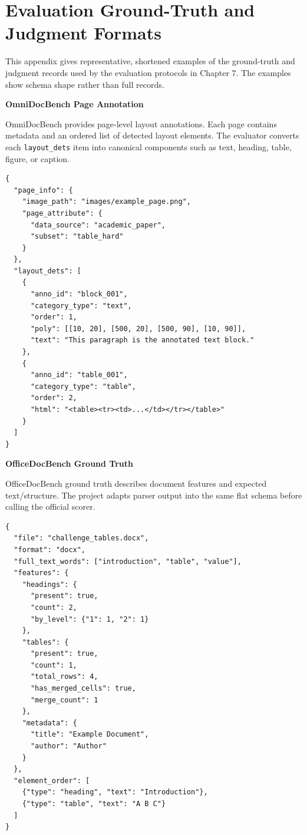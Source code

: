 \chapter{Evaluation Ground-Truth and Judgment Formats}\label{chap:evaluation_gt_formats}


This appendix gives representative, shortened examples of the ground-truth and judgment records used by the evaluation protocols in Chapter 7. The examples show schema shape rather than full records.

\textbf{OmniDocBench Page Annotation}

OmniDocBench provides page-level layout annotations. Each page contains metadata and an ordered list of detected layout elements. The evaluator converts each \texttt{layout\_dets} item into canonical components such as text, heading, table, figure, or caption.

\begin{lstlisting}[style=jsonappendix,caption={OmniDocBench page-level ground-truth format},label={lst:omnidocbench_gt_format}]
{
  "page_info": {
    "image_path": "images/example_page.png",
    "page_attribute": {
      "data_source": "academic_paper",
      "subset": "table_hard"
    }
  },
  "layout_dets": [
    {
      "anno_id": "block_001",
      "category_type": "text",
      "order": 1,
      "poly": [[10, 20], [500, 20], [500, 90], [10, 90]],
      "text": "This paragraph is the annotated text block."
    },
    {
      "anno_id": "table_001",
      "category_type": "table",
      "order": 2,
      "html": "<table><tr><td>...</td></tr></table>"
    }
  ]
}
\end{lstlisting}

\textbf{OfficeDocBench Ground Truth}

OfficeDocBench ground truth describes document features and expected text/structure. The project adapts parser output into the same flat schema before calling the official scorer.

\begin{lstlisting}[style=jsonappendix,caption={OfficeDocBench-style ground-truth format},label={lst:officedocbench_gt_format}]
{
  "file": "challenge_tables.docx",
  "format": "docx",
  "full_text_words": ["introduction", "table", "value"],
  "features": {
    "headings": {
      "present": true,
      "count": 2,
      "by_level": {"1": 1, "2": 1}
    },
    "tables": {
      "present": true,
      "count": 1,
      "total_rows": 4,
      "has_merged_cells": true,
      "merge_count": 1
    },
    "metadata": {
      "title": "Example Document",
      "author": "Author"
    }
  },
  "element_order": [
    {"type": "heading", "text": "Introduction"},
    {"type": "table", "text": "A B C"}
  ]
}
\end{lstlisting}

